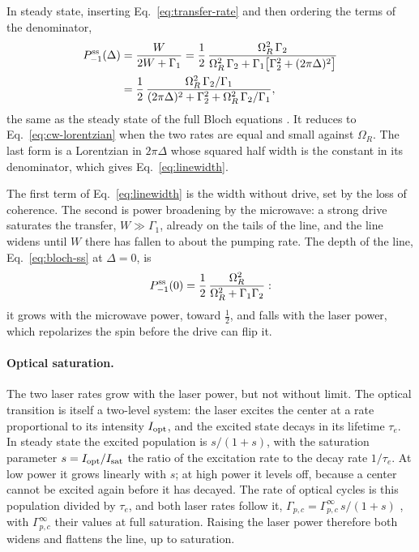 In steady state, inserting Eq.~\eqref{eq:transfer-rate} and then ordering the terms of the denominator,
\begin{equation}
  \begin{aligned}
  P_{-1}^{\rm ss}(\Delta)&=\frac{W}{2W+\Gamma_1}
  =\frac12\,\frac{\Omega_R^2\,\Gamma_2}{\Omega_R^2\,\Gamma_2+\Gamma_1\big[\Gamma_2^2+(2\pi\Delta)^2\big]}\\
  &=\frac12\,\frac{\Omega_R^2\,\Gamma_2/\Gamma_1}{(2\pi\Delta)^2+\Gamma_2^2+\Omega_R^2\,\Gamma_2/\Gamma_1},
  \end{aligned}
  \label{eq:bloch-ss}
\end{equation}
the same as the steady state of the full Bloch equations \cite{dreau2011}. It reduces to
Eq.~\eqref{eq:cw-lorentzian} when the two rates are equal and small against $\Omega_R$. The last form is a
Lorentzian in $2\pi\Delta$ whose squared half width is the constant in its denominator, which gives
Eq.~\eqref{eq:linewidth}.

The first term of Eq.~\eqref{eq:linewidth} is the width without drive, set by the loss of coherence. The
second is power broadening by the microwave: a strong drive saturates the transfer, $W\gg\Gamma_1$, already on the
tails of the line, and the line widens until $W$ there has fallen to about the pumping rate. The depth of the line,
Eq.~\eqref{eq:bloch-ss} at $\Delta=0$, is
\begin{equation*}
  P_{-1}^{\rm ss}(0)=\frac12\,\frac{\Omega_R^2}{\Omega_R^2+\Gamma_1\Gamma_2}:
\end{equation*}
it grows with the microwave power, toward $\tfrac12$, and falls with the laser power, which repolarizes the spin
before the drive can flip it.

\paragraph{Optical saturation.} The two laser rates grow with the laser power, but not without limit. The optical
transition is itself a two-level system: the laser excites the center at a rate proportional to its intensity
$I_{\rm opt}$, and the excited state decays in its lifetime $\tau_e$. In steady state the excited population is
$s/(1+s)$, with the saturation parameter $s=I_{\rm opt}/I_{\rm sat}$ the ratio of the excitation rate to the decay
rate $1/\tau_e$. At low power it grows linearly with $s$; at high power it levels off, because a center cannot be
excited again before it has decayed. The rate of optical cycles is this population divided by $\tau_e$, and both
laser rates follow it, $\Gamma_{p,c}=\Gamma_{p,c}^\infty\,s/(1+s)$ \cite{dreau2011}, with $\Gamma_{p,c}^\infty$ their
values at full saturation. Raising the laser power therefore both widens and flattens the line, up to saturation.

